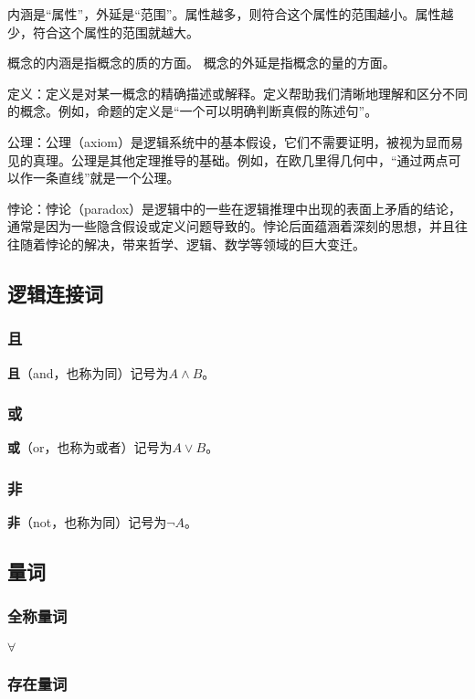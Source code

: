 内涵是“属性”，外延是“范围”。属性越多，则符合这个属性的范围越小。属性越少，符合这个属性的范围就越大。

概念的内涵是指概念的质的方面。
概念的外延是指概念的量的方面。

定义：定义是对某一概念的精确描述或解释。定义帮助我们清晰地理解和区分不同的概念。例如，命题的定义是“一个可以明确判断真假的陈述句”。

公理：公理（axiom）是逻辑系统中的基本假设，它们不需要证明，被视为显而易见的真理。公理是其他定理推导的基础。例如，在欧几里得几何中，“通过两点可以作一条直线”就是一个公理。

悖论：悖论（paradox）是逻辑中的一些在逻辑推理中出现的表面上矛盾的结论，通常是因为一些隐含假设或定义问题导致的。悖论后面蕴涵着深刻的思想，并且往往随着悖论的解决，带来哲学、逻辑、数学等领域的巨大变迁。

\subsection{逻辑连接词}

\subsubsection{且}

\textbf{且}（and，也称为同）记号为$A\land B$。

\subsubsection{或}

\textbf{或}（or，也称为或者）记号为$A\lor B$。


\subsubsection{非}
\textbf{非}（not，也称为同）记号为$\lnot A$。

\subsection{量词}

\subsubsection{全称量词}

$\forall$

\subsubsection{存在量词}

